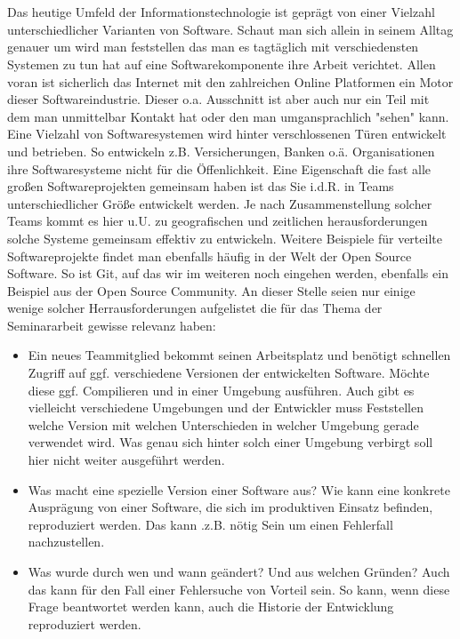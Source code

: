 \chapter{\preamble}
\label{cha:preamble}
Das heutige Umfeld der Informationstechnologie ist gepr\"agt von einer Vielzahl
unterschiedlicher Varianten von Software. Schaut man sich allein in seinem
Alltag genauer um wird man feststellen das man es tagt\"aglich mit
verschiedensten Systemen zu tun hat auf eine Softwarekomponente ihre Arbeit
verichtet. Allen voran ist sicherlich das Internet mit den zahlreichen Online
Platformen ein Motor dieser Softwareindustrie. Dieser o.a. Ausschnitt ist aber
auch nur ein Teil mit dem man unmittelbar Kontakt hat oder den man
umgansprachlich "sehen" kann.  Eine Vielzahl von Softwaresystemen wird hinter
verschlossenen T\"uren entwickelt und betrieben. So entwickeln z.B.
Versicherungen, Banken o.\"a. Organisationen ihre Softwaresysteme nicht f\"ur die
\"Offenlichkeit. Eine Eigenschaft die fast alle gro\ss{}en Softwareprojekten
gemeinsam haben ist das Sie i.d.R. in Teams unterschiedlicher Gr\"o\ss{}e entwickelt
werden. Je nach Zusammenstellung solcher Teams kommt es hier u.U. zu
geografischen und zeitlichen herausforderungen solche Systeme gemeinsam
effektiv zu entwickeln. Weitere Beispiele f\"ur verteilte Softwareprojekte findet
man ebenfalls h\"aufig in der Welt der Open Source Software. So ist Git, auf das
wir im weiteren noch eingehen werden, ebenfalls ein Beispiel aus der Open
Source Community. An dieser Stelle seien nur einige wenige solcher Herrausforderungen
aufgelistet die f\"ur das Thema der Seminararbeit gewisse relevanz haben:
\begin{itemize}
\item Ein neues Teammitglied bekommt seinen Arbeitsplatz und ben\"otigt
schnellen Zugriff auf ggf. verschiedene Versionen der entwickelten Software.
M\"ochte diese ggf. Compilieren und in einer Umgebung ausf\"uhren. Auch gibt es
vielleicht verschiedene Umgebungen und der Entwickler muss Feststellen welche
Version mit welchen Unterschieden in welcher Umgebung gerade verwendet wird.
Was genau sich hinter solch einer Umgebung verbirgt soll hier nicht weiter
ausgef\"uhrt werden.
\item Was macht eine spezielle Version einer Software aus? Wie kann eine
konkrete Auspr\"agung von einer Software, die sich im produktiven Einsatz
befinden, reproduziert werden. Das kann .z.B. n\"otig Sein um einen Fehlerfall
nachzustellen.
\item Was wurde durch wen und wann ge\"andert? Und aus welchen Gr\"unden? Auch das
kann f\"ur den Fall einer Fehlersuche von Vorteil sein. So kann, wenn diese Frage
beantwortet werden kann, auch die Historie der Entwicklung reproduziert werden.
\end{itemize}

